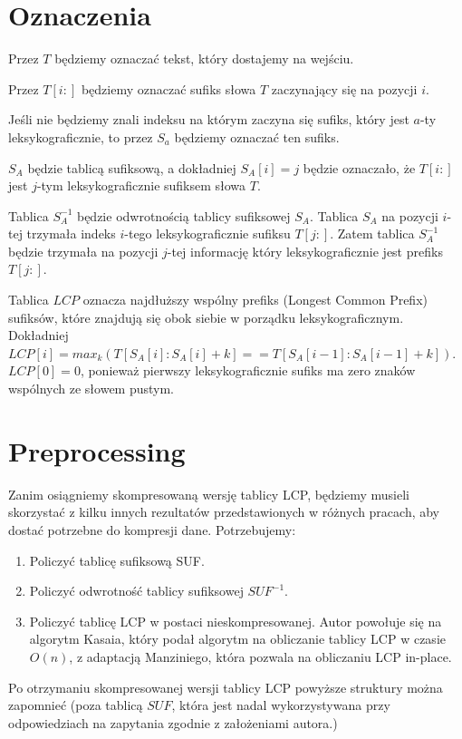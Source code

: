 \documentclass{article}
\begin{document}
\section{Oznaczenia}

Przez $T$ będziemy oznaczać tekst, który dostajemy na wejściu.

Przez $T[i:]$ będziemy oznaczać sufiks słowa $T$ zaczynający się na pozycji $i$.

Jeśli nie będziemy znali indeksu na którym zaczyna się sufiks, który jest $a$-ty leksykograficznie, to przez $S_a$ będziemy oznaczać ten sufiks.

$S_A$ będzie tablicą sufiksową, a dokładniej $S_A[i] = j$ będzie oznaczało, że $T[i:]$ jest $j$-tym leksykograficznie sufiksem słowa $T$.

Tablica $S_A^{-1}$ będzie odwrotnością tablicy sufiksowej $S_A$. Tablica $S_A$ na pozycji $i$-tej trzymała indeks $i$-tego leksykograficznie sufiksu $T[j:]$. Zatem tablica $S_A^{-1}$ będzie trzymała na pozycji $j$-tej informację który leksykograficznie jest prefiks $T[j:]$.

Tablica $LCP$ oznacza najdłuższy wspólny prefiks (Longest Common Prefix) sufiksów, które znajdują się obok siebie w porządku leksykograficznym. Dokładniej $LCP[i] = max_k(T[S_A[i]:S_A[i]+k] == T[S_A[i-1]:S_A[i-1]+k])$. $LCP[0] = 0$, ponieważ pierwszy leksykograficznie sufiks ma zero znaków wspólnych ze słowem pustym.

\section{Preprocessing}

Zanim osiągniemy skompresowaną wersję tablicy LCP, będziemy musieli skorzystać z kilku innych rezultatów przedstawionych w różnych pracach, aby dostać potrzebne do kompresji dane. Potrzebujemy:

\begin{enumerate}
    \item Policzyć tablicę sufiksową SUF.
    \item Policzyć odwrotność tablicy sufiksowej $SUF^{-1}$.
    \item Policzyć tablicę LCP w postaci nieskompresowanej. Autor powołuje się na algorytm Kasaia, który podał algorytm na obliczanie tablicy LCP w czasie $O(n)$, z adaptacją Manziniego, która pozwala na obliczaniu LCP in-place.
\end{enumerate}

Po otrzymaniu skompresowanej wersji tablicy LCP powyższe struktury można zapomnieć (poza tablicą $SUF$, która jest nadal wykorzystywana przy odpowiedziach na zapytania zgodnie z założeniami autora.)
\end{document}
